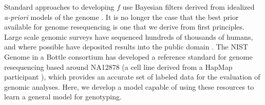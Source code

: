 \documentclass{article}
\begin{document}
Standard approaches to developing $f$ use Bayesian filters derived from idealized \emph{a-priori} models of the genome  \cite{samtools, gatk2011, garrison2012haplotype, rimmer2014integrating, li2011stats}.
It is no longer the case that the best prior available for genome resequencing is one that we derive from first principles. 
Large scale genomic surveys have sequenced hundreds of thousands of humans, and where possible have deposited results into the public domain \cite{1000Gphase1, 1000g2015, exac2015, cavalli2005human, uk10k2015uk10k}.
The NIST Genome in a Bottle consortium \cite{zook2014integrating} has developed a reference standard for genome resequencing based around NA12878 (a cell line derived from a HapMap participant \cite{gibbs2003international}), which provides an accurate set of labeled data for the evaluation of genomic analyses.
Here, we develop a model capable of using these resources to learn a general model for genotyping.


\end{document}
